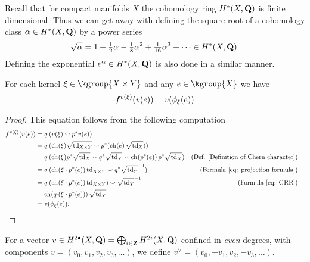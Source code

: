 \begin{remark}
    \label{sqrt of cohomology class}
    Recall that for compact manifolds $X$ the cohomology ring $H^{*}(X, \mathbf Q)$ is finite dimensional. Thus we can get away with defining the square root of a cohomology class $\alpha \in H^{*}(X, \mathbf Q)$ by a power series
    \[
        \sqrt{\alpha} = 1 + \tfrac{1}{2}\alpha - \tfrac{1}{8}\alpha^2 + \tfrac{1}{16}\alpha^3 + \cdots \in H^{*}(X, \mathbf Q).
    \]
    Defining the exponential $e^\alpha \in H^{*}(X, \mathbf Q)$ is also done in a similar manner. 
\end{remark}

\begin{proposition}
    \label{Mukai vector FM transform interaction}
    For each kernel $\xi \in \kgroup{X \times Y}$ and any $e \in \kgroup{X}$ we have
    \[
        f^{v(\xi)}(v(e)) = v(\phi_{\xi}(e))
    \]  
\end{proposition}

\begin{proof}
    This equation follows from the following computation
    \begin{align*}
        \fmcoh{v(\xi)}(v(e)) &=
        q_!(v(\xi) \smallsmile p^*v(e)) \\
        &= q_!(\ch[](\xi)\sqrt{\tdclass{X \times Y}} \smallsmile p^*(\ch[]{e}\sqrt{\tdclass{X}})) \\
        &= q_!(\ch[](\xi)p^*\sqrt{\tdclass{X}} \smallsmile q^*\sqrt{\tdclass{Y}} \smallsmile \ch[]{p^*(e)}p^*\sqrt{\tdclass{X}}) & \text{(Def. \ref{Definition of Chern character})} \\
        &= q_!(\ch[](\xi \cdot p^*(e))\tdclass{X \times Y} \smallsmile q^*\sqrt{\tdclass{Y}}\inv) & \text{(Formula \eqref{eq: projection formula})}\\
        &= q_!(\ch[](\xi \cdot p^*(e))\tdclass{X \times Y}) \smallsmile \sqrt{\tdclass{Y}}\inv & \text{(Formula \eqref{eq: GRR})} \\
        &= \ch[]{q_!(\xi \cdot p^*(e))}\sqrt{\tdclass{Y}} \\
        &= v(\fmkt{\xi}(e)). & & \qedhere
    \end{align*}
\end{proof}

\begin{definition}
    \label{Definition of v vee}
    For a vector $v \in H^{2\bullet}(X, \mathbf Q) = \bigoplus_{i \in \mathbf Z} H^{2i}(X, \mathbf Q)$ confined in \emph{even} degrees, with components $v = (v_0, v_1, v_2, v_3, \dots)$, we define $v^\vee = (v_0, -v_1, v_2, -v_3, \dots)$.
\end{definition}

